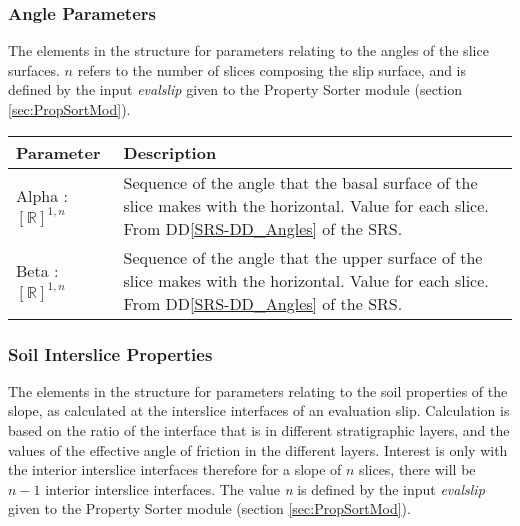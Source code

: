 \documentclass[12pt]{article}
\begin{document}
\subsubsection{Angle Parameters} \label{Tbl:AngleParam}
\noindent
The elements in the structure for parameters relating to the angles of
the slice surfaces. $n$ refers to the number of slices composing the
slip surface, and is defined by the input \textit{evalslip} given to
the Property Sorter module (section \ref{sec:PropSortMod}).

\begin{center}
\begin{longtable}{ p{}
    p{}}\hline 
  \textbf{Parameter} & \textbf{Description}\\ \hline

  Alpha : $[\mathbb{R}]^{1,n}$ & Sequence of the angle that the basal
  surface of the slice makes with the horizontal. Value for each
  slice. From DD\ref{SRS-DD_Angles} of the SRS.\\

  Beta : $[\mathbb{R}]^{1,n}$ & Sequence of the angle that the upper
  surface of the slice makes with the horizontal. Value for each
  slice. From DD\ref{SRS-DD_Angles} of the SRS.\\ \hline
\end{longtable}
\end{center}

\subsubsection{Soil Interslice Properties} \label{Tbl:SoilIntParam}
The elements in the structure for parameters relating to the soil
properties of the slope, as calculated at the interslice interfaces of
an evaluation slip. Calculation is based on the ratio of the interface
that is in different stratigraphic layers, and the values of the
effective angle of friction in the different layers. Interest is only
with the interior interslice interfaces therefore for a slope of $n$
slices, there will be $n-1$ interior interslice interfaces. The value
\textit{n} is defined by the input \textit{evalslip} given to the
Property Sorter module (section \ref{sec:PropSortMod}).
\end{document}
